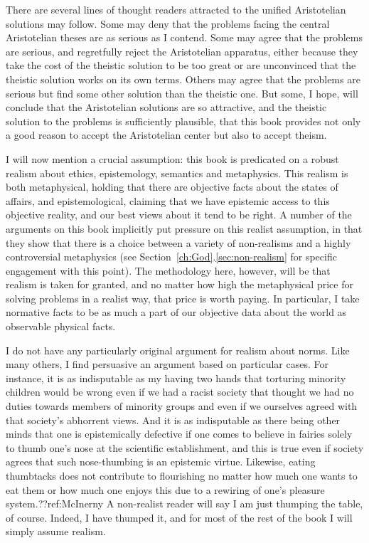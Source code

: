 There are several lines of thought readers attracted to the unified Aristotelian solutions may  follow. Some
may deny that the problems facing the central Aristotelian theses are as serious as I contend. Some may agree that
the problems are serious, and regretfully reject the Aristotelian apparatus, either because they take the cost of 
the theistic solution to be too great or are unconvinced that the theistic solution works on its own terms. 
Others may agree that the problems are serious but find some other solution than the theistic one. But some, I hope, 
will conclude that the Aristotelian solutions are so attractive, and the theistic solution to the problems is sufficiently 
plausible, that this book provides not only a good reason to accept the Aristotelian center but also to accept
theism.

I will now mention a crucial assumption: this book is predicated on a robust realism about ethics, epistemology, semantics and 
metaphysics. This realism is both metaphysical, holding that there are objective facts about the states of affairs, and 
epistemological, claiming that we have epistemic access to this objective reality, and our best views about it tend to be 
right.  A number of the arguments on this book implicitly put pressure on this realist assumption, in that they show that 
there is a choice between a variety of non-realisms and a highly controversial metaphysics (see 
Section~\ref{ch:God}.\ref{sec:non-realism}
for specific engagement with this point). The methodology here, however, 
will be that realism is taken for granted, and no matter how high the metaphysical price for solving problems in a realist
way, that price is worth paying. In particular, I take normative facts to be as much a part of our objective data about 
the world as observable physical facts. 

I do not have any particularly original argument for realism about norms. Like many others, I find persuasive an argument based on particular
cases. For instance, it is as indisputable as my having two hands that torturing minority children would be wrong even if we had 
a racist society that thought we had no duties towards members of minority groups and even if we ourselves agreed with 
that society's abhorrent views. And it is as indisputable as there being other minds that one is epistemically defective if one comes 
to believe in fairies solely to thumb one's nose at the scientific establishment, and this is true even if society agrees 
that such nose-thumbing is an epistemic virtue. Likewise, eating thumbtacks does not contribute to flourishing no matter how much one wants 
to eat them or how much one enjoys this due to a rewiring of one's pleasure system.??ref:McInerny A non-realist reader will say I am just thumping the table, of course. 
Indeed, I have thumped it, and for most of the rest of the book I will simply assume realism.


